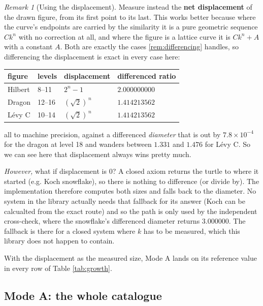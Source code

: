 \documentclass[11pt, a4paper]{article}
\theoremstyle{plain}
\theoremstyle{definition}
\theoremstyle{remark}
\newtheorem{remark}[theorem]{Remark}
\begin{document}
\begin{remark}[Using the displacement]
\label{rem:endpoint}
    Measure instead the \textbf{net displacement} of the drawn figure, from its
    first point to its last. This works better because
    where the curve's endpoints are carried by the similarity it is a pure
    geometric sequence $Ck^n$ with no correction at all, and where the figure
    is a lattice curve it is $Ck^n+A$ with a constant $A$. Both are
    exactly the cases \ref{rem:differencing} handles, so differencing the
    displacement is exact in every case here:
    \begin{center}
    \begin{tabular}{llll}
    \hline
    figure & levels & displacement & differenced ratio \\
    \hline
    Hilbert  & 8--11  & $2^n-1$          & $2.000000000$ \\
    Dragon   & 12--16 & $(\sqrt2)^{\,n}$ & $1.414213562$ \\
    L\'evy C & 10--14 & $(\sqrt2)^{\,n}$ & $1.414213562$ \\
    \hline
    \end{tabular}
    \end{center}
    all to machine precision, against a differenced \emph{diameter} that is out
    by $7.8\times10^{-4}$ for the dragon at level 18 and wanders between
    $1.331$ and $1.476$ for L\'evy C. So we can see here that displacement always wins pretty much.

    \textit{However,} what if displacement is 0? A closed axiom returns the turtle to
    where it started (e.g. Koch snowflake), so there is nothing to difference (or divide by). 
    The implementation therefore computes both sizes and falls back to the diameter. 
    No system in the library actually needs that fallback for its answer (Koch can be calcualted from the exact route) 
    and so the path is only used by the independent cross-check, where the snowflake's differenced diameter returns $3.000000$. 
    The fallback is there for a closed system where $k$ has to be measured, which this library does not happen to contain.
\end{remark}

\noindent With the displacement as the measured size, Mode A lands on its
reference value in every row of Table \ref{tab:growth}.
\subsection{Mode A: the whole catalogue}
\label{sec:modearesults}
\end{document}
